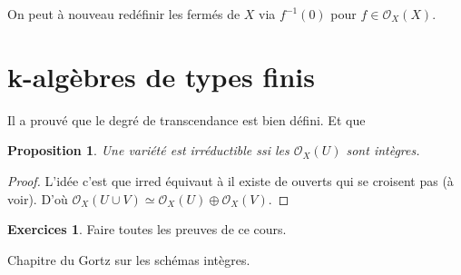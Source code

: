\documentclass[a4paper,12pt]{book}
\newcommand{\Or}{\mathcal{O}}
\theoremstyle{plain}
\newtheorem{prop}[subsection]{Proposition}
\theoremstyle{definition}
\newtheorem{exo}[subsection]{Exercices}
\theoremstyle{remark}
\begin{document}
On peut à nouveau redéfinir les fermés de $X$ via $f^{-1}(0)$ pour 
$f\in\Or_X(X)$.
\section{k-algèbres de types finis}
Il a prouvé que le degré de transcendance est bien défini. Et que
\begin{prop}
    Une variété est irréductible ssi les $\Or_X(U)$ sont intègres.
\end{prop}
\begin{proof}
    L'idée c'est que irred équivaut à il existe de ouverts qui se 
    croisent pas (à voir). D'où 
    $\Or_X(U\cup V)\simeq\Or_X(U)\oplus \Or_X(V)$.
\end{proof}
\begin{exo}
    Faire toutes les preuves de ce cours.
\end{exo}

Chapitre du Gortz sur les schémas intègres.


\printbibliography
\end{document}
